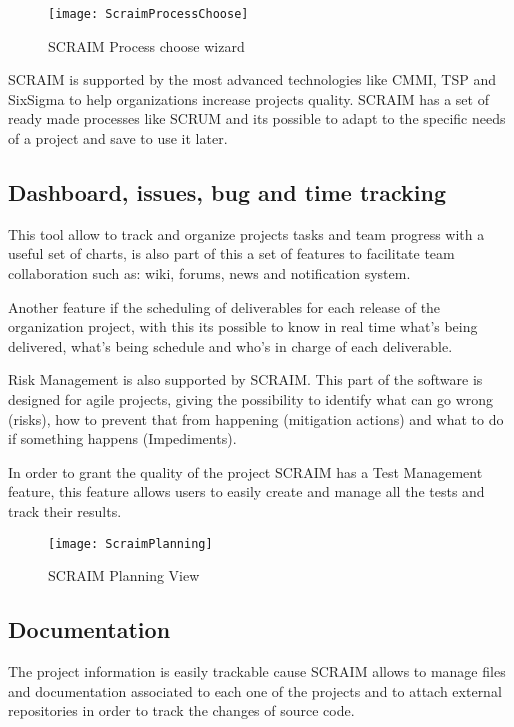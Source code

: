 \begin{figure}[h]
	\begin{center}
		\leavevmode
		\texttt{[image: ScraimProcessChoose]}
		\caption{SCRAIM Process choose wizard}
		\label{fig:scraimrocesschoose}
	\end{center}
\end{figure}

SCRAIM is supported by the most advanced technologies like CMMI\citep{Development2010}, TSP and SixSigma\citep{SixSigmaWeb} to help organizations increase projects quality.
SCRAIM has a set of ready made processes like SCRUM\citep{Pries2011} and its possible to adapt to the specific needs of a project and save to use it later.

\subsection{Dashboard, issues, bug and time tracking}
This tool allow to track and organize projects tasks and team progress with a useful set of charts, is also part of this a set of features to facilitate team collaboration such as: wiki, forums, news and notification system.

Another feature if the scheduling of deliverables for each release of the organization project, with this its possible to know in real time what's being delivered, what's being schedule and who's in charge of each deliverable.

Risk Management is also supported by SCRAIM. This part of the software is designed for agile projects, giving the possibility to identify what can go wrong (risks), how to prevent that from happening (mitigation actions) and what to do if something happens (Impediments). 

In order to grant the quality of the project SCRAIM has a Test Management feature, this feature allows users to easily create and manage all the tests and track their results.

\begin{figure}[h]
	\begin{center}
		\leavevmode
		\texttt{[image: ScraimPlanning]}
		\caption{SCRAIM Planning View}
		\label{fig:scraimplanning}
	\end{center}
\end{figure}


\subsection{Documentation}

The project information is easily trackable cause SCRAIM allows  to manage files and documentation associated to each one of the projects and to attach external repositories in order to track the changes of source code.